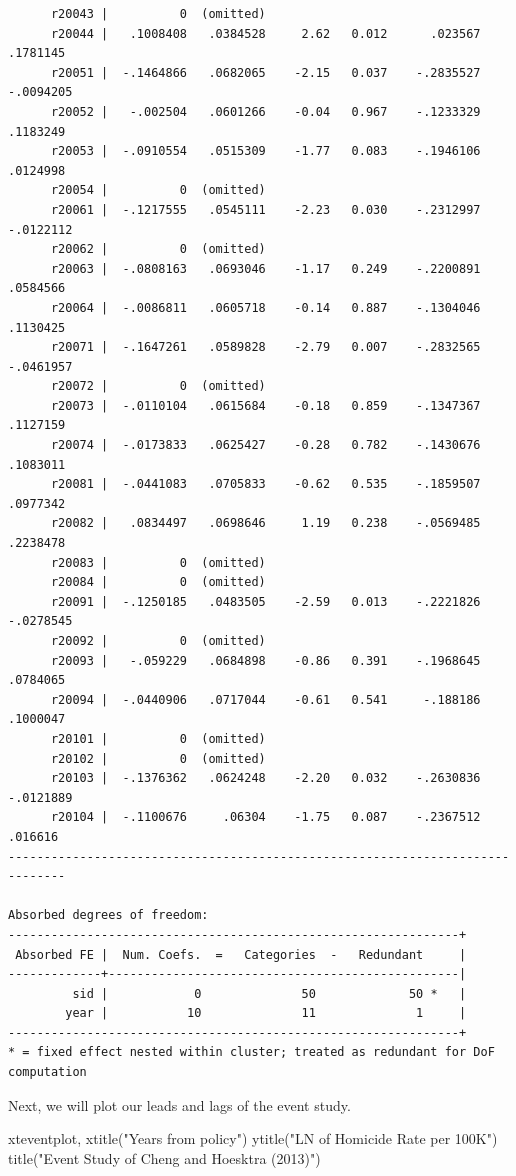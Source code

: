 \documentclass[
]{book}
\newenvironment{Shaded}{\begin{snugshade}}{\end{snugshade}}
\newcommand{\BaseNTok}[1]{\textcolor[rgb]{0.00,0.00,0.81}{#1}}
\newcommand{\NormalTok}[1]{#1}
\newcommand{\StringTok}[1]{\textcolor[rgb]{0.31,0.60,0.02}{#1}}
\begin{document}
\begin{verbatim}
      r20043 |          0  (omitted)
      r20044 |   .1008408   .0384528     2.62   0.012      .023567    .1781145
      r20051 |  -.1464866   .0682065    -2.15   0.037    -.2835527   -.0094205
      r20052 |   -.002504   .0601266    -0.04   0.967    -.1233329    .1183249
      r20053 |  -.0910554   .0515309    -1.77   0.083    -.1946106    .0124998
      r20054 |          0  (omitted)
      r20061 |  -.1217555   .0545111    -2.23   0.030    -.2312997   -.0122112
      r20062 |          0  (omitted)
      r20063 |  -.0808163   .0693046    -1.17   0.249    -.2200891    .0584566
      r20064 |  -.0086811   .0605718    -0.14   0.887    -.1304046    .1130425
      r20071 |  -.1647261   .0589828    -2.79   0.007    -.2832565   -.0461957
      r20072 |          0  (omitted)
      r20073 |  -.0110104   .0615684    -0.18   0.859    -.1347367    .1127159
      r20074 |  -.0173833   .0625427    -0.28   0.782    -.1430676    .1083011
      r20081 |  -.0441083   .0705833    -0.62   0.535    -.1859507    .0977342
      r20082 |   .0834497   .0698646     1.19   0.238    -.0569485    .2238478
      r20083 |          0  (omitted)
      r20084 |          0  (omitted)
      r20091 |  -.1250185   .0483505    -2.59   0.013    -.2221826   -.0278545
      r20092 |          0  (omitted)
      r20093 |   -.059229   .0684898    -0.86   0.391    -.1968645    .0784065
      r20094 |  -.0440906   .0717044    -0.61   0.541     -.188186    .1000047
      r20101 |          0  (omitted)
      r20102 |          0  (omitted)
      r20103 |  -.1376362   .0624248    -2.20   0.032    -.2630836   -.0121889
      r20104 |  -.1100676     .06304    -1.75   0.087    -.2367512     .016616
------------------------------------------------------------------------------

Absorbed degrees of freedom:
---------------------------------------------------------------+
 Absorbed FE |  Num. Coefs.  =   Categories  -   Redundant     | 
-------------+-------------------------------------------------|
         sid |            0              50             50 *   | 
        year |           10              11              1     | 
---------------------------------------------------------------+
* = fixed effect nested within cluster; treated as redundant for DoF computation
\end{verbatim}

Next, we will plot our leads and lags of the event study.

\begin{Shaded}
\begin{Highlighting}[]
\NormalTok{xteventplot, }\BaseNTok{xtitle}\NormalTok{(}\StringTok{"Years from policy"}\NormalTok{) }\BaseNTok{ytitle}\NormalTok{(}\StringTok{"LN of Homicide Rate per 100K"}\NormalTok{) }\BaseNTok{title}\NormalTok{(}\StringTok{"Event Study of Cheng and Hoesktra (2013)"}\NormalTok{)}
\end{Highlighting}
\end{Shaded}
\end{document}
